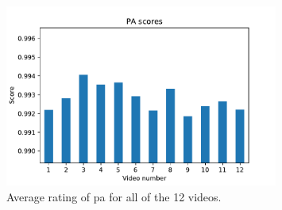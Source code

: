 \begin{figure}[H]
    \centering
    \includegraphics[width=0.8\textwidth]{img/results_objective_measures/PA.pdf}
    \caption{Average rating of \acrlong{pa} for all of the 12 videos.}
    \label{fig:video_rating_pa}
\end{figure}